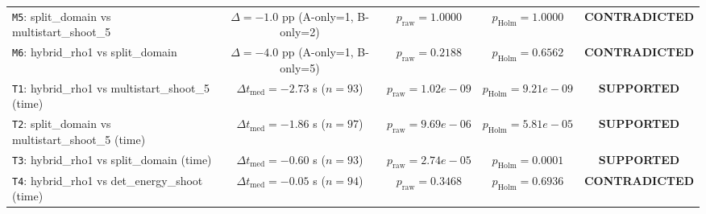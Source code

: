 \begin{table}[t]
\begin{tabular}{lccccc}
\texttt{M5}: split\_domain vs multistart\_shoot\_5 & $\Delta=-1.0$ pp (A-only=1, B-only=2) & $p_{\mathrm{raw}}=1.0000$ & $p_{\mathrm{Holm}}=1.0000$ & \multicolumn{2}{c}{\textbf{CONTRADICTED}} \\
\texttt{M6}: hybrid\_rho1 vs split\_domain & $\Delta=-4.0$ pp (A-only=1, B-only=5) & $p_{\mathrm{raw}}=0.2188$ & $p_{\mathrm{Holm}}=0.6562$ & \multicolumn{2}{c}{\textbf{CONTRADICTED}} \\
\texttt{T1}: hybrid\_rho1 vs multistart\_shoot\_5 (time) & $\Delta t_{\mathrm{med}}=-2.73$ s ($n=93$) & $p_{\mathrm{raw}}=1.02e-09$ & $p_{\mathrm{Holm}}=9.21e-09$ & \multicolumn{2}{c}{\textbf{SUPPORTED}} \\
\texttt{T2}: split\_domain vs multistart\_shoot\_5 (time) & $\Delta t_{\mathrm{med}}=-1.86$ s ($n=97$) & $p_{\mathrm{raw}}=9.69e-06$ & $p_{\mathrm{Holm}}=5.81e-05$ & \multicolumn{2}{c}{\textbf{SUPPORTED}} \\
\texttt{T3}: hybrid\_rho1 vs split\_domain (time) & $\Delta t_{\mathrm{med}}=-0.60$ s ($n=93$) & $p_{\mathrm{raw}}=2.74e-05$ & $p_{\mathrm{Holm}}=0.0001$ & \multicolumn{2}{c}{\textbf{SUPPORTED}} \\
\texttt{T4}: hybrid\_rho1 vs det\_energy\_shoot (time) & $\Delta t_{\mathrm{med}}=-0.05$ s ($n=94$) & $p_{\mathrm{raw}}=0.3468$ & $p_{\mathrm{Holm}}=0.6936$ & \multicolumn{2}{c}{\textbf{CONTRADICTED}} \\
\bottomrule
\end{tabular}
\end{table}
